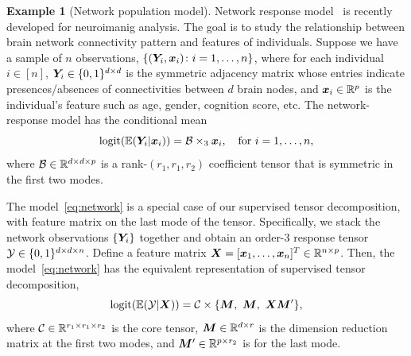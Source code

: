 \documentclass[10pt]{article}
\theoremstyle{definition}
\theoremstyle{definition}
\newtheorem{example}{Example}
\theoremstyle{definition}
\begin{document}
\begin{example}[Network population model]\label{example:brain}
Network response model~\cite{rabusseau2016low, zhang2018network} is recently developed for neuroimanig analysis. The goal is to study the relationship between brain network connectivity pattern and features of individuals. Suppose we have a sample of $n$ observations, $\{(\bm Y_i, \bm x_i)\colon i=1,\ldots,n\}$, where for each individual $i\in[n]$, $\bm Y_i\in\{0,1\}^{d\times d}$ is the symmetric adjacency matrix whose entries indicate presences/absences of connectivities between $d$ brain nodes, and $\bm x_i\in\mathbb{R}^p$ is the individual's feature such as age, gender, cognition score, etc. The network-response model  has the conditional mean
\begin{equation}\label{eq:network}
\textup{logit}(\mathbb{E}(\bm Y_i|\bm x_i))=\mathcal{B}\times_3\bm x_i, \quad \text{for }i=1,\ldots,n,
\end{equation}
where $\mathcal{B}\in \mathbb{R}^{d\times d\times p}$ is a rank-$(r_1,r_1,r_2)$ coefficient tensor that is symmetric in the first two modes.  

The model~\eqref{eq:network} is a special case of our supervised tensor decomposition, with feature matrix on the last mode of the tensor. Specifically, we stack the network observations $\{\bm Y_i\}$ together and obtain an order-3 response tensor $\mathcal{Y}\in\{0,1\}^{d\times d\times n}$. Define a feature matrix $\bm X=[\bm x_1,\ldots,\bm x_n]^T\in\mathbb{R}^{n\times p}$. Then, the model~\eqref{eq:network} has the equivalent representation of supervised tensor decomposition,
\[
\textup{logit}(\mathbb{E}(\tY|\mX))=\tC\times\{\mM,\ \mM,\ \mX\mM'\},
\]
where $\mathcal{C}\in\mathbb{R}^{r_1\times r_1\times r_2}$ is the core tensor, $\bm M\in\mathbb{R}^{d\times r}$ is the dimension reduction matrix at the first two modes, and $\bm M'\in\mathbb{R}^{p\times r_2}$ is for the last mode.\\
 \end{example}
 
\end{document}
